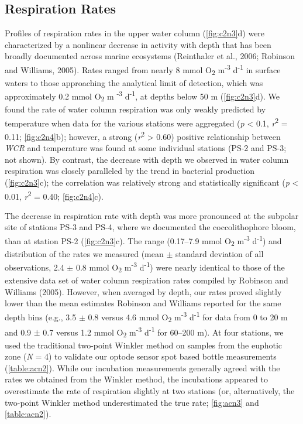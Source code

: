 \subsection{Respiration Rates}

Profiles of respiration rates in the upper water column (\autoref{fig:c2n3}d) were characterized by a nonlinear decrease in activity with depth that has been broadly documented across marine ecosystems (Reinthaler et al., 2006; Robinson and Williams, 2005). Rates ranged from nearly 8 mmol O\textsubscript{2} m\textsuperscript{-3} d\textsuperscript{-1} in surface waters to those approaching the analytical limit of detection, which was approximately 0.2 mmol O\textsubscript{2} m \textsuperscript{-3} d\textsuperscript{-1}, at depths below 50 m (\autoref{fig:c2n3}d). We found the rate of water column respiration was only weakly predicted by temperature when data for the various stations were aggregated (\emph{p} \textless{} 0.1, \emph{r}\textsuperscript{2} = 0.11; \autoref{fig:c2n4}b); however, a strong (\emph{r}\textsuperscript{2}  \textgreater{} 0.60) positive relationship between \emph{WCR} and temperature was found at some individual stations (PS-2 and PS-3; not shown). By contrast, the decrease with depth we observed in water column respiration was closely paralleled by the trend in bacterial production (\autoref{fig:c2n3}c); the correlation was relatively strong and statistically significant (\emph{p} \textless{} 0.01, \emph{r}\textsuperscript{2} = 0.40; \autoref{fig:c2n4}c).

The decrease in respiration rate with depth was more pronounced at the subpolar site of stations PS-3 and PS-4, where we documented the coccolithophore bloom, than at station PS-2 (\autoref{fig:c2n3}c). The range (0.17--7.9 mmol O\textsubscript{2} m\textsuperscript{-3} d\textsuperscript{-1}) and distribution of the rates we measured (mean $\pm$ standard deviation of all observations, 2.4 $\pm$ 0.8 mmol O\textsubscript{2} m\textsuperscript{-3} d\textsuperscript{-1}) were nearly identical to those of the extensive data set of water column respiration rates compiled by Robinson and Williams (2005). However, when averaged by depth, our rates proved slightly lower than the mean estimates Robinson and Williams reported for the same depth bins (e.g., 3.5 $\pm$ 0.8 versus 4.6 mmol O\textsubscript{2} m\textsuperscript{-3} d\textsuperscript{-1} for data from 0 to 20 m and 0.9 $\pm$ 0.7 versus 1.2 mmol O\textsubscript{2} m\textsuperscript{-3} d\textsuperscript{-1} for 60--200 m). At four stations, we used the traditional two-point Winkler method on samples from the euphotic zone (\emph{N} = 4) to validate our optode sensor spot based bottle measurements (\autoref{table:acn2}). While our incubation measurements generally agreed with the rates we obtained from the Winkler method, the incubations appeared to overestimate the rate of respiration slightly at two stations (or, alternatively, the two-point Winkler method underestimated the true rate; \autoref{fig:acn3} and \autoref{table:acn2}).

